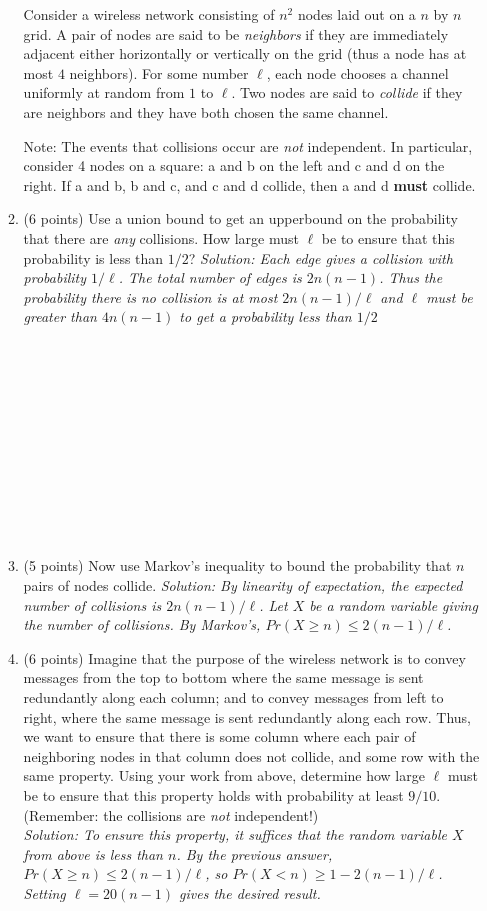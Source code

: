 \documentclass[11pt]{article}
\newcommand{\ans}[1]{\emph{Solution: #1}}
\begin{document}
\begin{enumerate}
\begin{enumerate}
 Consider a wireless network consisting of $n^{2}$ nodes laid out on a $n$ by $n$ grid.  A pair of nodes are said to be \emph{neighbors} if they are immediately adjacent either horizontally or vertically on the grid (thus a node has at most $4$ neighbors).  For some number $\ell$, each node chooses a channel uniformly at random from $1$ to $\ell$.  Two nodes are said to \emph{collide} if they are neighbors and they have both chosen the same channel.
 
 Note: The events that collisions occur are \emph{not} independent.  In particular, consider 4 nodes on a square: a and b on the left and c and d on the right.   If a and b, b and c, and c and d collide, then a and d {\bf must} collide.
 
 \item (6 points) Use a union bound to get an upperbound on the probability that there are \emph{any} collisions.  How large must $\ell$ be to ensure that this probability is less than $1/2$?
 \ans{Each edge gives a collision with probability $1/\ell$.  The total number of edges is $2n(n-1)$.  Thus the probability there is no collision is at most $2n(n-1)/\ell$ and $\ell$ must be greater than $4n(n-1)$ to get a probability less than $1/2$}
  \ \\ \ \\  \ \\ \ \\ \ \\  \ \\ \ \\ \ \\  \ \\ \ \\ \ \\  \ \\

 
 \item (5 points) Now use Markov's inequality to bound the probability that $n$ pairs of nodes collide.
 \ans{By linearity of expectation, the expected number of collisions is $2n(n-1)/\ell$.  Let $X$ be a random variable giving the number of collisions.  By Markov's, $Pr(X \geq n) \leq 2(n-1)/\ell$.}
 
 \pagebreak
 
 \item (6 points) Imagine that the purpose of the wireless network is to convey messages from the top to bottom where the same message is sent redundantly along each column; and to convey messages from left to right, where the same message is sent redundantly along each row.  Thus, we want to ensure that there is some column where each pair of neighboring nodes in that column does not collide, and some row with the same property.  Using your work from above, determine how large $\ell$ must be to ensure that this property holds with probability at least $9/10$.  (Remember: the collisions are \emph{not} independent!)\\
\ans{To ensure this property, it suffices that the random variable $X$ from above is less than $n$.  By the previous answer,  $Pr(X \geq n) \leq 2(n-1)/\ell$, so $Pr(X < n) \geq 1- 2(n-1)/\ell$.  Setting $\ell = 20(n-1)$ gives the desired result.}


\end{enumerate}
\end{enumerate}
\end{document}
